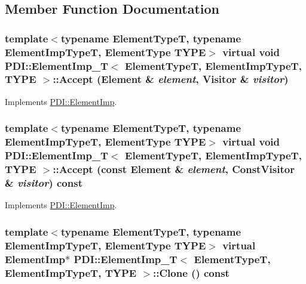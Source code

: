 \subsection{Member Function Documentation}
\hypertarget{class_p_d_i_1_1_element_imp___t_69151861ad5ad48355c81810f0d5b95b}{
\subsubsection[{Accept}]{\setlength{\rightskip}{0pt plus 5cm}template$<$typename ElementTypeT, typename ElementImpTypeT, ElementType TYPE$>$ virtual void {\bf PDI::ElementImp\_\-T}$<$ ElementTypeT, ElementImpTypeT, TYPE $>$::Accept ({\bf Element} \& {\em element}, \/  {\bf Visitor} \& {\em visitor})}}
\label{class_p_d_i_1_1_element_imp___t_69151861ad5ad48355c81810f0d5b95b}




Implements \hyperlink{class_p_d_i_1_1_element_imp_7734c5f4b0ebd52ef8ee8c3faa4951d7}{PDI::ElementImp}.\hypertarget{class_p_d_i_1_1_element_imp___t_e3290d73bffe4f6d3e5c31ed13ec217a}{
\subsubsection[{Accept}]{\setlength{\rightskip}{0pt plus 5cm}template$<$typename ElementTypeT, typename ElementImpTypeT, ElementType TYPE$>$ virtual void {\bf PDI::ElementImp\_\-T}$<$ ElementTypeT, ElementImpTypeT, TYPE $>$::Accept (const {\bf Element} \& {\em element}, \/  {\bf ConstVisitor} \& {\em visitor}) const}}
\label{class_p_d_i_1_1_element_imp___t_e3290d73bffe4f6d3e5c31ed13ec217a}




Implements \hyperlink{class_p_d_i_1_1_element_imp_441e3d2c989f21db8e01ae77616a9f77}{PDI::ElementImp}.\hypertarget{class_p_d_i_1_1_element_imp___t_5b9c768557a43a6a352db1660df50e04}{
\subsubsection[{Clone}]{\setlength{\rightskip}{0pt plus 5cm}template$<$typename ElementTypeT, typename ElementImpTypeT, ElementType TYPE$>$ virtual {\bf ElementImp}$\ast$ {\bf PDI::ElementImp\_\-T}$<$ ElementTypeT, ElementImpTypeT, TYPE $>$::Clone () const}}
\label{class_p_d_i_1_1_element_imp___t_5b9c768557a43a6a352db1660df50e04}




